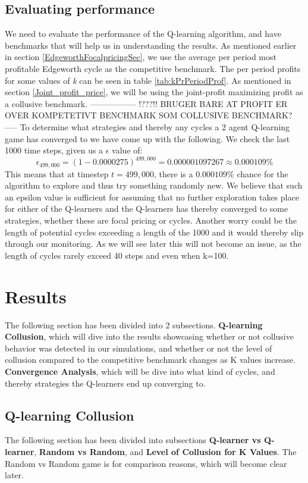 \documentclass{article}
\begin{document}
\subsection{Evaluating performance}
We need to evaluate the performance of the Q-learning algorithm, and have benchmarks that will help us in understanding the results. 
As mentioned earlier in section \ref{EdgeworthFocalpricingSec}, we use the average per period most profitable Edgeworth cycle as the competitive benchmark. The per period profits for some values of \textit{k} can be seen in table \ref{tab:kPrPeriodProf}. As mentioned in section \ref{Joint_profit_price}, we will be using the joint-profit maximizing profit as a collusive benchmark. ----------------- !???!! BRUGER BARE AT PROFIT ER OVER KOMPETETIVT BENCHMARK SOM COLLUSIVE BENCHMARK?----- 
\newline
To determine what strategies and thereby any cycles a 2 agent Q-learning game has converged to we have come up with the following. We check the last 1000 time steps, given us a  $\epsilon$ value of:
\begin{equation}
    \epsilon_{499,000}= (1-0.0000275)^{499,000}=0.000001097267\approx 0.000109\%
\end{equation} 
This means that at timestep $t = 499,000$, there is a $0.000109\%$ chance for the algorithm to explore and thus try something randomly new. 
We believe that such an epsilon value is sufficient for assuming that no further exploration takes place for either of the Q-learners and the Q-learners has thereby converged to some strategies, whether these are focal pricing or cycles. Another worry could be the length of potential cycles exceeding a length of the 1000 and it would thereby slip through our monitoring. As we will see later this will not become an issue, as the length of cycles rarely exceed 40 steps and even when k=100. 

\section{Results}
\label{Results section}
The following section has been divided into 2 subsections. \textbf{Q-learning Collusion}, which will dive into the results showcasing whether or not collusive behavior was detected in our simulations, and whether or not the level of collusion compared to the competitive benchmark changes as K values increase. \textbf{Convergence Analysis}, which will be dive into what kind of cycles, and thereby strategies the Q-learners end up converging to. 
\subsection{Q-learning Collusion}
\label{Q-learning Collusion}
The following section has been divided into subsections \textbf{Q-learner vs Q-learner}, \textbf{Random vs Random}, and \textbf{Level of Collusion for K Values}. The Random vs Random game is for comparison reasons, which will become clear later. 
\end{document}
